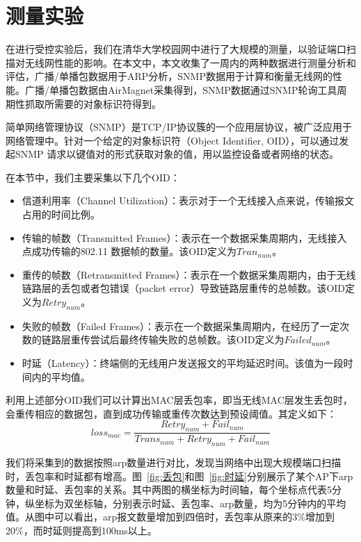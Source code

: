 \section{测量实验}
在进行受控实验后，我们在清华大学校园网中进行了大规模的测量，以验证端口扫描对无线网性能的影响。在本文中，本文收集了一周内的两种数据进行测量分析和评估，广播/单播包数据用于ARP分析，SNMP数据用于计算和衡量无线网的性能。广播/单播包数据由AirMagnet采集得到，SNMP数据通过SNMP轮询工具周期性抓取所需要的对象标识符得到。



简单网络管理协议（SNMP）是TCP/IP协议簇的一个应用层协议，被广泛应用于网络管理中\cite{perkins1997understanding}。针对一个给定的对象标识符（Object Identifier, OID），可以通过发起SNMP 请求以键值对的形式获取对象的值，用以监控设备或者网络的状态。

在本节中，我们主要采集以下几个OID：

\begin{itemize}
  \item 信道利用率（Channel Utilization）：表示对于一个无线接入点来说，传输报文占用的时间比例。
  \item 传输的帧数（Transmitted Frames）：表示在一个数据采集周期内，无线接入点成功传输的802.11 数据帧的数量。该OID定义为$Tran_{num}$。
  \item 重传的帧数（Retransmitted Frames）：表示在一个数据采集周期内，由于无线链路层的丢包或者包错误（packet error）导致链路层重传的总帧数。该OID定义为$Retry_{num}$。
  \item 失败的帧数（Failed Frames）：表示在一个数据采集周期内，在经历了一定次数的链路层重传尝试后最终传输失败的总帧数。该OID定义为$Failed_{num}$。
  \item 时延（Latency）：终端侧的无线用户发送报文的平均延迟时间。该值为一段时间内的平均值。
\end{itemize}
利用上述部分OID我们可以计算出MAC层丢包率，即当无线MAC层发生丢包时，会重传相应的数据包，直到成功传输或重传次数达到预设阈值。其定义如下：
\begin{equation}
  {loss}_{mac} = \frac{{Retry}_{num} + {Fail}_{num}}{{Trans}_{num} + {Retry}_{num} + {Fail}_{num}}
\end{equation}

我们将采集到的数据按照arp数量进行对比，发现当网络中出现大规模端口扫描时，丢包率和时延都有增高。图~\ref{fig:丢包}和图~\ref{fig:时延}分别展示了某个AP下arp数量和时延、丢包率的关系。其中两图的横坐标为时间轴，每个坐标点代表5分钟，纵坐标为双坐标轴，分别表示时延、丢包率、arp数量，均为5分钟内的平均值。从图中可以看出，arp报文数量增加到四倍时，丢包率从原来的3\%增加到20\%，而时延则提高到100ms以上。

